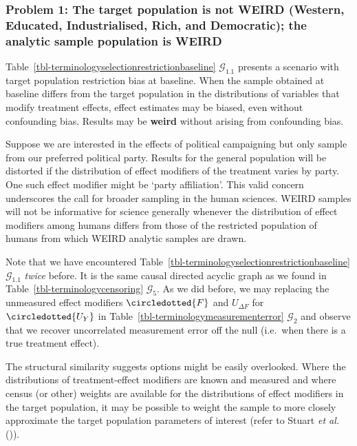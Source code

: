 \documentclass[
  single column]{article}
\begin{document}
\subsubsection{Problem 1: The target population is not WEIRD (Western,
Educated, Industrialised, Rich, and Democratic); the analytic sample
population is
WEIRD}\label{problem-1-the-target-population-is-not-weird-western-educated-industrialised-rich-and-democratic-the-analytic-sample-population-is-weird}

Table~\ref{tbl-terminologyselectionrestrictionbaseline}
\(\mathcal{G}_{1.1}\) presents a scenario with target population
restriction bias at baseline. When the sample obtained at baseline
differs from the target population in the distributions of variables
that modify treatment effects, effect estimates may be biased, even
without confounding bias. Results may be \textbf{weird} without arising
from confounding bias.

Suppose we are interested in the effects of political campaigning but
only sample from our preferred political party. Results for the general
population will be distorted if the distribution of effect modifiers of
the treatment varies by party. One such effect modifier might be `party
affiliation'. This valid concern underscores the call for broader
sampling in the human sciences. WEIRD samples will not be informative
for science generally whenever the distribution of effect modifiers
among humans differs from those of the restricted population of humans
from which WEIRD analytic samples are drawn.

Note that we have encountered
Table~\ref{tbl-terminologyselectionrestrictionbaseline}
\(\mathcal{G}_{1.1}\) \emph{twice} before. It is the same causal
directed acyclic graph as we found in
Table~\ref{tbl-terminologycensoring} \(\mathcal{G}_5\). As we did
before, we may replacing the unmeasured effect modifiers
\(\circledotted{F}\) and \(U_{\Delta F}\) for \(\circledotted{U_Y}\) in
Table~\ref{tbl-terminologymeasurementerror} \(\mathcal{G}_2\) and
observe that we recover uncorrelated measurement error off the null
(i.e.~when there is a true treatment effect).

The structural similarity suggests options might be easily overlooked.
Where the distributions of treatment-effect modifiers are known and
measured and where census (or other) weights are available for the
distributions of effect modifiers in the target population, it may be
possible to weight the sample to more closely approximate the target
population parameters of interest (refer to Stuart \emph{et al.}
()).
\end{document}
